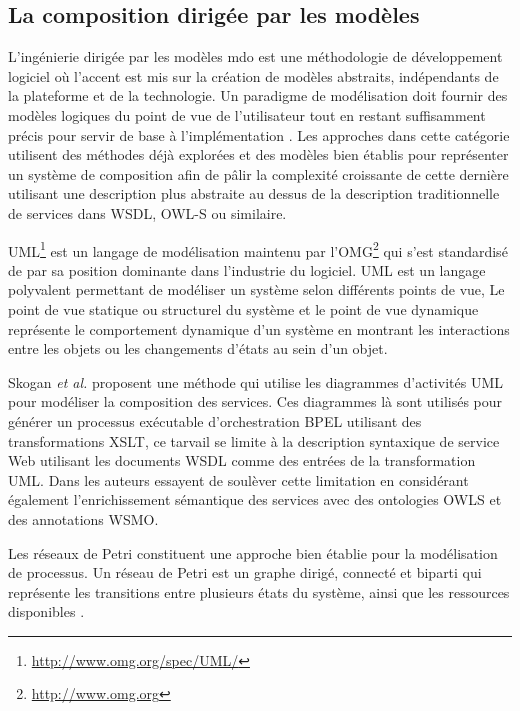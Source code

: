     \subsection{La composition dirigée par les modèles}
    \label{sec:model-based-composition}

    L'ingénierie dirigée par les modèles \acrshort{mdo} est une
    méthodologie de développement logiciel où l'accent est mis sur la
    création de modèles abstraits, indépendants de la plateforme et de
    la technologie. Un paradigme de modélisation doit fournir des
    modèles logiques du point de vue de l'utilisateur tout en restant
    suffisamment précis pour servir de base à l'implémentation
    \cite{dumez2010approche}. Les approches dans cette catégorie
    utilisent des méthodes déjà explorées et des modèles bien établis
    pour représenter un système de composition afin de pâlir la
    complexité croissante de cette dernière utilisant une description
    plus abstraite au dessus de la description traditionnelle de
    services dans \textsc{WSDL}, \textsc{OWL-S} ou similaire.

    \textsc{UML}\footnote{\url{http://www.omg.org/spec/UML/}}
    \cite{rumbaugh2004unified} est un langage de modélisation maintenu
    par l'\textsc{OMG}\footnote{\url{http://www.omg.org}} qui s'est
    standardisé de par sa position dominante dans l'industrie du
    logiciel. \textsc{UML} est un langage polyvalent permettant de
    modéliser un système selon différents points de vue, Le point de
    vue statique ou structurel du système et le point de vue dynamique
    représente le comportement dynamique d'un système en montrant les
    interactions entre les objets ou les changements d'états au sein
    d'un objet.

    Skogan \textit{et al.}  \cite{skogan2004web} proposent une méthode
    qui utilise les diagrammes d'activités \textsc{UML} pour modéliser
    la composition des services. Ces diagrammes là sont utilisés pour
    générer un processus exécutable d'orchestration \textsc{BPEL}
    utilisant des transformations \textsc{XSLT}, ce tarvail se limite
    à la description syntaxique de service Web utilisant les documents
    \textsc{WSDL} comme des entrées de la transformation
    \textsc{UML}. Dans \cite{gronmo2005model} les auteurs essayent de
    soulèver cette limitation en considérant également
    l'enrichissement sémantique des services avec des ontologies
    \textsc{OWLS} et des annotations \textsc{WSMO}.

    Les réseaux de Petri \cite{petri1962kommunikation} constituent une
    approche bien établie pour la modélisation de processus. Un réseau
    de Petri est un graphe dirigé, connecté et biparti qui représente
    les transitions entre plusieurs états du système, ainsi que les
    ressources disponibles \cite{dumez2010approche}.

